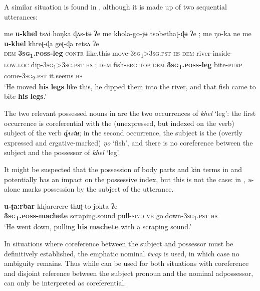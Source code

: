 \documentclass[output=paper]{langscibook}
\begin{document}
A similar situation is found in , although it is made up of two sequential utterances:

\ea%
    \label{ex:Lahaussois:31}
    \gll me \textbf{u-khel} tsʌi hoŋka ɖʌs-tʉ ʔe me khola-go-jʉ     tsobethaʈ-ɖʉ ʔe ; me ŋo-ka ne me \textbf{u-khel} khreʈ-ɖa geʈ-ɖa retsʌ ʔe\\
        \textsc{dem}   \textbf{\textsc{3sg}}\textbf{\textsc{\textsubscript{1}}}\textbf{\textsc{.poss-}}\textbf{leg}  \textsc{contr}  like.this  move-\textsc{3sg}\textsc{\textsubscript{1}}\textsc{>3sg.pst}  \textsc{hs}   \textsc{dem} river-inside-\textsc{low.loc}  dip-\textsc{3sg}\textsc{\textsubscript{1}}\textsc{>3sg.pst}  \textsc{hs} ; \textsc{dem} fish-\textsc{erg} \textsc{top}   \textsc{dem} \textbf{\textsc{3sg}}\textbf{\textsc{\textsubscript{1}}}\textbf{\textsc{.poss-}}\textbf{leg} bite-\textsc{purp}   come-\textsc{3sg}\textsc{\textsubscript{2}}\textsc{.pst}  it.seems  \textsc{hs}\\
    \glt ‘He moved \textbf{his} \textbf{legs} like this, he dipped them into the river, and that fish came to bite   \textbf{his} \textbf{legs}.'
    \z

The two relevant possessed nouns in  are the two occurrences of \textit{khel} ‘leg': the first occurrence is coreferential with the (unexpressed, but indexed on the verb) subject of the verb \textit{ɖʌstʉ}; in the second occurrence, the subject is the (overtly expressed and ergative-marked) \textit{ŋo} ‘fish', and there is no coreference between the subject and the possessor of \textit{khel} ‘leg'.

 It might be suspected that the possession of body parts and kin terms in  and  potentially has an impact on the possessive index, but this is not the case: in , \textit{u}{}- alone marks possession by the subject of the utterance.

\ea%
    \label{ex:Lahaussois:32}
    \gll \textbf{u-ʈa:rbar} khjarerere thʉʈ-to jokta ʔe\\
        \textbf{\textsc{3sg}}\textbf{\textsc{\textsubscript{1}}}\textbf{\textsc{.poss}}\textbf{{}-machete} scraping.sound pull-\textsc{sim.cvb} go.down-\textsc{3sg}\textsc{\textsubscript{1}}\textsc{.pst}  \textsc{hs}\\
    \glt ‘He went down, pulling \textbf{his} \textbf{machete} with a scraping sound.'
    \z

In situations where coreference between the subject and possessor must be definitively established, the emphatic nominal \textit{twap} is used, in which case no ambiguity remains.  Thus while  can be used for both situations with coreference and disjoint reference between the subject pronoun and the nominal adpossessor,  can only be interpreted as coreferential.
\end{document}
